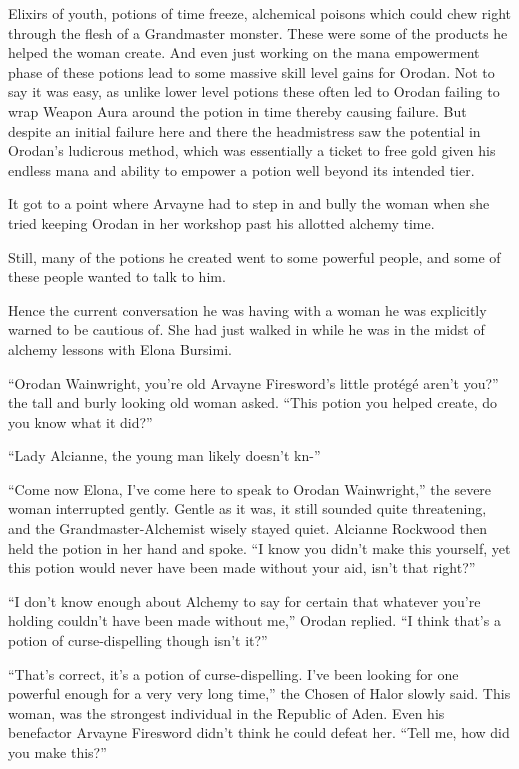 \documentclass[a4paper,10pt]{book}
\begin{document}
Elixirs of youth, potions of time freeze, alchemical poisons which could chew right through the flesh of a Grandmaster monster. These were some of the products he helped the woman create. And even just working on the mana empowerment phase of these potions lead to some massive skill level gains for Orodan. Not to say it was easy, as unlike lower level potions these often led to Orodan failing to wrap Weapon Aura around the potion in time thereby causing failure. But despite an initial failure here and there the headmistress saw the potential in Orodan’s ludicrous method, which was essentially a ticket to free gold given his endless mana and ability to empower a potion well beyond its intended tier.\par
It got to a point where Arvayne had to step in and bully the woman when she tried keeping Orodan in her workshop past his allotted alchemy time.\par
Still, many of the potions he created went to some powerful people, and some of these people wanted to talk to him.\par
Hence the current conversation he was having with a woman he was explicitly warned to be cautious of. She had just walked in while he was in the midst of alchemy lessons with Elona Bursimi.\par
“Orodan Wainwright, you’re old Arvayne Firesword’s little protégé aren’t you?” the tall and burly looking old woman asked. “This potion you helped create, do you know what it did?”\par
“Lady Alcianne, the young man likely doesn’t kn-”\par
“Come now Elona, I’ve come here to speak to Orodan Wainwright,” the severe woman interrupted gently. Gentle as it was, it still sounded quite threatening, and the Grandmaster-Alchemist wisely stayed quiet. Alcianne Rockwood then held the potion in her hand and spoke. “I know you didn’t make this yourself, yet this potion would never have been made without your aid, isn’t that right?”\par
“I don’t know enough about Alchemy to say for certain that whatever you’re holding couldn’t have been made without me,” Orodan replied. “I think that’s a potion of curse-dispelling though isn’t it?”\par
“That’s correct, it’s a potion of curse-dispelling. I’ve been looking for one powerful enough for a very very long time,” the Chosen of Halor slowly said. This woman, was the strongest individual in the Republic of Aden. Even his benefactor Arvayne Firesword didn’t think he could defeat her. “Tell me, how did you make this?”\par
\end{document}
